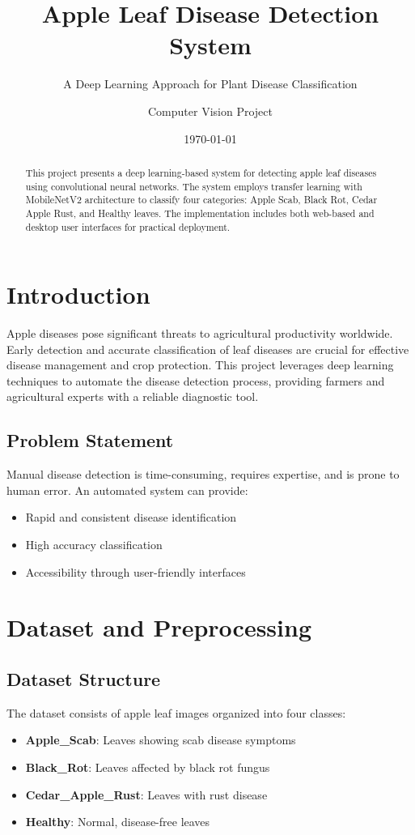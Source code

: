 \documentclass[12pt,a4paper]{article}
\title{\textbf{Apple Leaf Disease Detection System}}
\subtitle{A Deep Learning Approach for Plant Disease Classification}
\author{Computer Vision Project}
\date{\today}
\begin{document}
\maketitle

\begin{abstract}
This project presents a deep learning-based system for detecting apple leaf diseases using convolutional neural networks. The system employs transfer learning with MobileNetV2 architecture to classify four categories: Apple Scab, Black Rot, Cedar Apple Rust, and Healthy leaves. The implementation includes both web-based and desktop user interfaces for practical deployment.
\end{abstract}

\tableofcontents
\newpage

\section{Introduction}

Apple diseases pose significant threats to agricultural productivity worldwide. Early detection and accurate classification of leaf diseases are crucial for effective disease management and crop protection. This project leverages deep learning techniques to automate the disease detection process, providing farmers and agricultural experts with a reliable diagnostic tool.

\subsection{Problem Statement}
Manual disease detection is time-consuming, requires expertise, and is prone to human error. An automated system can provide:
\begin{itemize}
    \item Rapid and consistent disease identification
    \item High accuracy classification
    \item Accessibility through user-friendly interfaces
\end{itemize}

\section{Dataset and Preprocessing}

\subsection{Dataset Structure}
The dataset consists of apple leaf images organized into four classes:
\begin{itemize}
    \item \textbf{Apple\_Scab}: Leaves showing scab disease symptoms
    \item \textbf{Black\_Rot}: Leaves affected by black rot fungus
    \item \textbf{Cedar\_Apple\_Rust}: Leaves with rust disease
    \item \textbf{Healthy}: Normal, disease-free leaves
\end{itemize}
\end{document}
